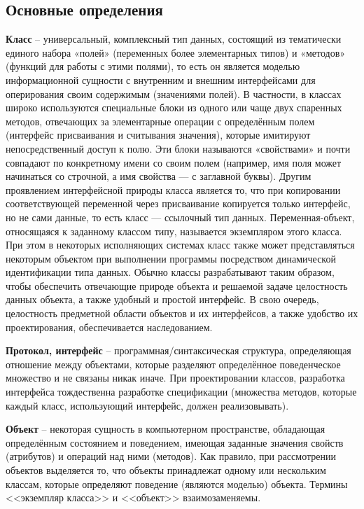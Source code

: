 \subsection{Основные определения}

\textbf{Класс} -- универсальный, комплексный тип данных, состоящий из тематически единого набора «полей» (переменных более элементарных типов) и «методов» (функций для работы с этими полями), то есть он является моделью информационной сущности с внутренним и внешним интерфейсами для оперирования своим содержимым (значениями полей). В частности, в классах широко используются специальные блоки из одного или чаще двух спаренных методов, отвечающих за элементарные операции с определённым полем (интерфейс присваивания и считывания значения), которые имитируют непосредственный доступ к полю. Эти блоки называются «свойствами» и почти совпадают по конкретному имени со своим полем (например, имя поля может начинаться со строчной, а имя свойства — с заглавной буквы). Другим проявлением интерфейсной природы класса является то, что при копировании соответствующей переменной через присваивание копируется только интерфейс, но не сами данные, то есть класс — ссылочный тип данных. Переменная-объект, относящаяся к заданному классом типу, называется экземпляром этого класса. При этом в некоторых исполняющих системах класс также может представляться некоторым объектом при выполнении программы посредством динамической идентификации типа данных. Обычно классы разрабатывают таким образом, чтобы обеспечить отвечающие природе объекта и решаемой задаче целостность данных объекта, а также удобный и простой интерфейс. В свою очередь, целостность предметной области объектов и их интерфейсов, а также удобство их проектирования, обеспечивается наследованием\cite{wiki:oop}.

\textbf{Протокол, интерфейс} -- программная/синтаксическая структура, определяющая отношение между объектами, которые разделяют определённое поведенческое множество и не связаны никак иначе. При проектировании классов, разработка интерфейса тождественна разработке спецификации (множества методов, которые каждый класс, использующий интерфейс, должен реализовывать)\cite{wiki:protocol}.

\textbf{Объект} -- некоторая сущность в компьютерном пространстве, обладающая определённым состоянием и поведением, имеющая заданные значения свойств (атрибутов) и операций над ними (методов). Как правило, при рассмотрении объектов выделяется то, что объекты принадлежат одному или нескольким классам, которые определяют поведение (являются моделью) объекта. Термины <<экземпляр класса>> и <<объект>> взаимозаменяемы\cite{wiki:object}.